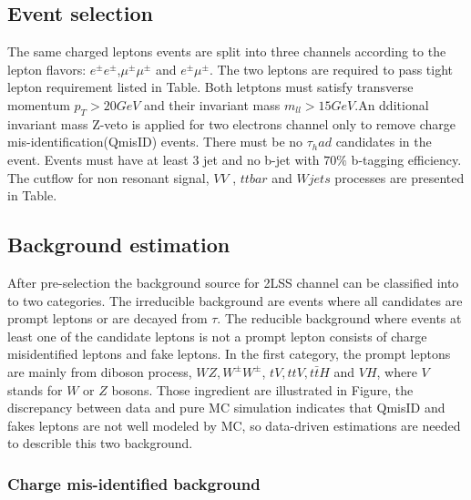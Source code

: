 \subsection{Event selection}
\label{sec:EventSelection}
The same charged leptons events are split into three channels according to the lepton flavors: $e^{\pm}e^{\pm}$,$\mu^{\pm}\mu^{\pm}$ and $e^{\pm}\mu^{\pm}$. The two leptons are required to pass tight lepton requirement listed in Table. Both letptons must satisfy transverse momentum $p_T>20GeV$ and their invariant mass $m_{ll}>15GeV$.An dditional invariant mass Z-veto is applied for two electrons channel only to remove charge mis-identification(QmisID) events. There must be no $\tau_had$ candidates in the event. Events must have at least 3 jet and no b-jet with $70\%$ b-tagging efficiency. 
The cutflow for non resonant signal, $VV$ , $ttbar$ and $Wjets$ processes are presented in Table.	
\subsection{Background estimation}
After pre-selection the background source for 2LSS channel can be classified into to two categories. The irreducible background are events where all candidates are prompt leptons or are decayed from $\tau$. The reducible background where events at least one of the candidate leptons is not a prompt lepton consists of charge misidentified leptons and fake leptons. In the first category, the prompt leptons are mainly from diboson process, $WZ,W^{\pm}W^{\pm}$, $tV,ttV,t\bar{t}H$ and $VH$, where $V$ stands for $W$ or $Z$ bosons. Those ingredient are illustrated in Figure, the discrepancy between data and pure MC simulation indicates that QmisID and fakes leptons are not well modeled by MC, so data-driven estimations are needed to describle this two background.

\subsubsection{Charge mis-identified background}

